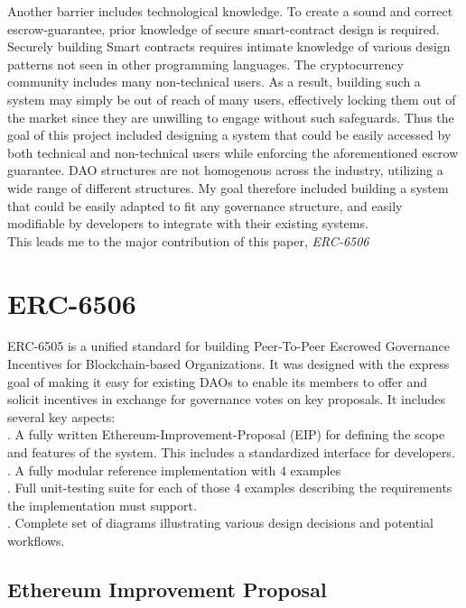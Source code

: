 \documentclass{article}
\begin{document}
Another barrier includes technological knowledge. To create a sound and correct escrow-guarantee, prior knowledge of secure smart-contract design is required. Securely building Smart contracts requires intimate knowledge of various design patterns not seen in other programming languages. The cryptocurrency community includes many non-technical users. As a result, building such a system may simply be out of reach of many users, effectively locking them out of the market since they are unwilling to engage without such safeguards. Thus the goal of this project included designing a system that could be easily accessed by both technical and non-technical users while enforcing the aforementioned escrow guarantee. DAO structures are not homogenous across the industry, utilizing a wide range of different structures. My goal therefore included building a system that could be easily adapted to fit any governance structure, and easily modifiable by developers to integrate with their existing systems.\\

This leads me to the major contribution of this paper, \emph{ERC-6506}


\section{ERC-6506}

ERC-6505 is a unified standard for building Peer-To-Peer Escrowed Governance Incentives for Blockchain-based Organizations. It was designed with the express goal of making it easy for existing DAOs to enable its members to offer and solicit incentives in exchange for governance votes on key proposals. It includes several key aspects:\\

. A fully written Ethereum-Improvement-Proposal (EIP) for defining the scope and features of the system. This includes a standardized interface for developers.\\

. A fully modular reference implementation with 4 examples\\

. Full unit-testing suite for each of those 4 examples describing the requirements the implementation must support.\\

. Complete set of diagrams illustrating various design decisions and potential workflows.

\subsection{Ethereum Improvement Proposal}
\end{document}
